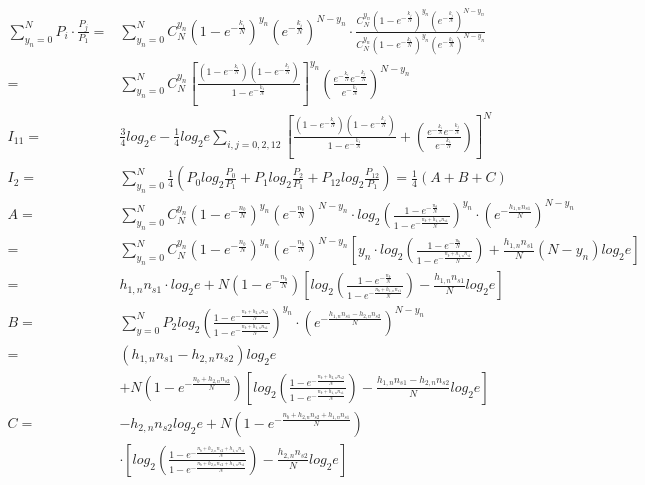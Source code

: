 \documentclass[12pt]{article}
\begin{document}
\begin{equation*}
    \begin{aligned}
       \sum_{y_n=0}^NP_i·\frac{P_j}{P_1}=&\sum_{y_n=0}^NC_N^{y_n}\left(1-e^{-\frac{k_i}{N}}\right)^{y_n}\left(e^{-\frac{k_i}{N}}\right)^{N-y_n}·\frac{C_N^{y_n}\left(1-e^{-\frac{k_j}{N}}\right)^{y_n}\left(e^{-\frac{k_j}{N}}\right)^{N-y_n}}{C_N^{y_n}\left(1-e^{-\frac{k_1}{N}}\right)^{y_n}\left(e^{-\frac{k_1}{N}}\right)^{N-y_n}}\\
        =&\sum_{y_n=0}^NC_N^{y_n}\left[\frac{\left(1-e^{-\frac{k_i}{N}}\right)\left(1-e^{-\frac{k_j}{N}}\right)}{1-e^{-\frac{k_1}{N}}}\right]^{y_n}\left(\frac{e^{-\frac{k_i}{N}}e^{-\frac{k_j}{N}}}{e^{-\frac{k_1}{N}}}\right)^{N-y_n}\\
        I_{11}=&\frac{3}{4}log_2e-\frac{1}{4}log_2e\sum_{i,j=0,2,12}\left[\frac{\left(1-e^{-\frac{k_i}{N}}\right)\left(1-e^{-\frac{k_j}{N}}\right)}{1-e^{-\frac{k_1}{N}}}+\left(\frac{e^{-\frac{k_i}{N}}e^{-\frac{k_j}{N}}}{e^{-\frac{k_1}{N}}}\right)\right]^{N}\\
        I_2=&\sum_{y_n=0}^N\frac{1}{4}(P_{0}log_2\frac{P_0}{P_1}+P_{1}log_2\frac{P_2}{P_1}+P_{12}log_2\frac{P_{12}}{P_1}) = \frac{1}{4}(A+B+C) \\
        A=&\sum_{y_n=0}^NC_N^{y_n}\left(1-e^{-\frac{n_b}{N}}\right)^{y_n}\left(e^{-\frac{n_b}{N}}\right)^{N-y_n}·log_2\left(\frac{1-e^{-\frac{n_b}{N}}}{1-e^{-\frac{n_b+h_{1,n}n_{s1}}{N}}}\right)^{y_n}·\left(e^{-\frac{h_{1,n}n_{s1}}{N}}\right)^{N-y_n} \\ 
        =&\sum_{y_n=0}^NC_N^{y_n}\left(1-e^{-\frac{n_b}{N}}\right)^{y_n}\left(e^{-\frac{n_b}{N}}\right)^{N-y_n}\left[y_n·log_2\left(\frac{1-e^{-\frac{n_b}{N}}}{1-e^{-\frac{n_b+h_{1,n}n_{s1}}{N}}}\right)+\frac{h_{1,n}n_{s1}}{N}(N-y_n)log_2e\right] \\
        =& h_{1,n}n_{s1}·log_2e+N\left(1-e^{-\frac{n_b}{N}}\right)\left[log_2\left(\frac{1-e^{-\frac{n_b}{N}}}{1-e^{-\frac{n_b+h_{1,n}n_{s1}}{N}}}\right)-\frac{h_{1,n}n_{s1}}{N}log_2e\right] \\
        B=&\sum_{y=0}^NP_2log_2\left(\frac{1-e^{-\frac{n_b+h_{2,n}n_{s2}}{N}}}{1-e^{-\frac{n_b+h_{1,n}n_{s1}}{N}}}\right)^{y_n}·\left(e^{-\frac{h_{1,n}n_{s1}-h_{2,n}n_{s2}}{N}}\right)^{N-y_n} \\
        =&(h_{1,n}n_{s1}-h_{2,n}n_{s2})log_2e\\
        &+N\left(1-e^{-\frac{n_b+h_{2,n}n_{s2}}{N}}\right)\left[log_2\left(\frac{1-e^{-\frac{n_b+h_{2,n}n_{s2}}{N}}}{1-e^{-\frac{n_b+h_{1,n}n_{s1}}{N}}}\right)-\frac{h_{1,n}n_{s1}-h_{2,n}n_{s2}}{N}log_2e\right] \\
        C=&-h_{2,n}n_{s2}log_2e+N\left(1-e^{-\frac{n_b+h_{2,n}n_{s2}+h_{1,n}n_{s1}}{N}}\right)\\
        &·\left[log_2\left(\frac{1-e^{-\frac{n_b+h_{2,n}n_{s2}+h_{1,n}n_{s1}}{N}}}{1-e^{-\frac{n_b+h_{2,n}n_{s2}+h_{1,n}n_{s1}}{N}}}\right)-\frac{h_{2,n}n_{s2}}{N}log_2e\right]
    \end{aligned}
\end{equation*}
\end{document}
